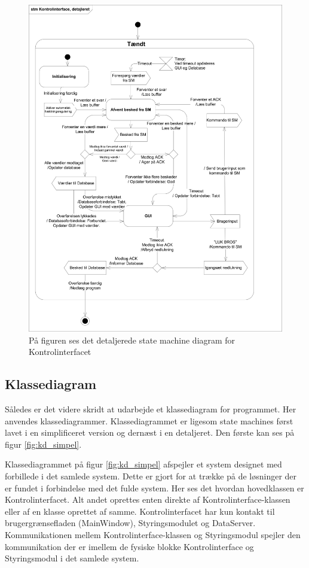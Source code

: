 \begin{figure}[htbp]
\centering
\label{fig:stm_detaljeret}
\includegraphics[width=1\textwidth]{billeder/GUI/STM_KI_DETALJERET}
\caption{På figuren ses det detaljerede state machine diagram for Kontrolinterfacet}
\end{figure}

\subsection{Klassediagram}
Således er det videre skridt at udarbejde et klassediagram for programmet. Her anvendes klassediagrammer. Klassediagrammet er ligesom state machines først lavet i en simplificeret version og dernæst i en detaljeret. Den første kan ses på figur \ref{fig:kd_simpel}.

Klassediagrammet på figur \ref{fig:kd_simpel} afspejler et system designet med forbillede i det samlede system. Dette er gjort for at trække på de løsninger der er fundet i forbindelse med det fulde system. Her ses det hvordan hovedklassen er Kontrolinterfacet. Alt andet oprettes enten direkte af Kontrolinterface-klassen eller af en klasse oprettet af samme. Kontrolinterfacet har kun kontakt til brugergrænsefladen (MainWindow), Styringsmodulet og DataServer. Kommunikationen mellem Kontrolinterface-klassen og Styringsmodul spejler den kommunikation der er imellem de fysiske blokke Kontrolinterface og Styringsmodul i det samlede system.\\

